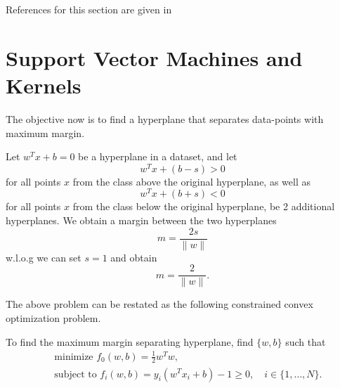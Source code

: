 \documentclass[12 pt]{article}        	%
\begin{document}
References for this section are given in 
\begin{center}
    \cite[ch.8.5.1-8.5.5,8.6.1]{pml1Book}
\end{center}

\section{Support Vector Machines and Kernels}

The objective now is to find a hyperplane that separates data-points with maximum margin.

\begin{defi}
    Let $ w^T x + b = 0 $ be a hyperplane in a dataset, and let 
    \[
        w^T x + ( b - s ) > 0 
    \]
    for all points $ x $ from the class above the original hyperplane, as well as
    \[
        w^T x + ( b + s ) < 0 
    \]
    for all points $ x $ from the class below the original hyperplane, be 2 additional hyperplanes.
    We obtain a margin between the two hyperplanes 
    \[
        m = \frac{ 2 s }{ \lVert w \rVert}
    \]
    w.l.o.g we can set $ s = 1 $ and obtain
    \[
        m = \frac{ 2 }{ \lVert w \rVert }.
    \]
\end{defi}

The above problem can be restated as the following constrained convex optimization problem.

\begin{defi}
\label{separating_hyperplane_convex_optimization}
    To find the maximum margin separating hyperplane,
    find $ \{ w , b \} $ such that
    \begin{align*}
        &\text{ minimize } f_0 ( w , b ) = \frac{ 1 }{ 2 } w^T w,
        \\
        &\text{ subject to } f_i ( w , b ) = y_i ( w^T x_i + b ) - 1 \geq 0 , \quad 
        i \in \{ 1 , \dotsc , N \}.
    \end{align*}
\end{defi}
\end{document}
